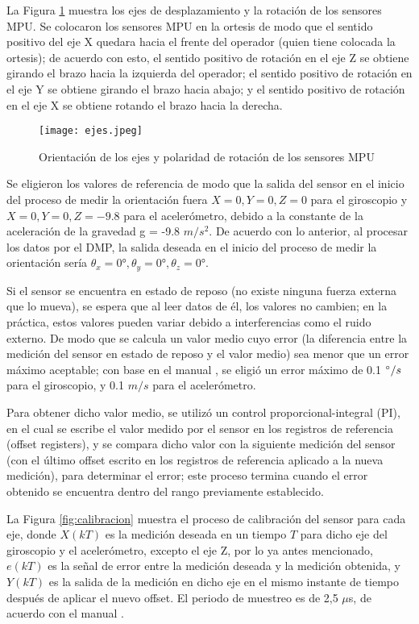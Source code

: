 \newpage
La Figura \ref{fig:ejes} muestra los ejes de desplazamiento y la rotación de los sensores MPU. Se colocaron los sensores MPU en la ortesis de modo que el sentido positivo del eje X quedara hacia el frente del operador (quien tiene colocada la ortesis); de acuerdo con esto, el sentido positivo de rotación en el eje Z se obtiene girando el brazo hacia la izquierda del operador; el sentido positivo de rotación en el eje Y se obtiene girando el brazo hacia abajo; y el sentido positivo de rotación en el eje X se obtiene rotando el brazo hacia la derecha.

\begin{figure}[htb]
	\centering
	\texttt{[image: ejes.jpeg]}
	\caption{Orientación de los ejes y polaridad de rotación de los sensores MPU}
	\label{fig:ejes}
\end{figure}

Se eligieron los valores de referencia de modo que la salida del sensor en el inicio del proceso de medir la orientación fuera $X=0, Y=0, Z=0$ para el giroscopio y $X=0, Y=0, Z=-9.8$ para el acelerómetro, debido a la constante de la aceleración de la gravedad g = -9.8  $m/s^2$. De acuerdo con lo anterior, al procesar los datos por el DMP, la salida deseada en el inicio del proceso de medir la orientación sería $\theta_x = 0°,\theta_y = 0°,\theta_z = 0°$.

Si el sensor se encuentra en estado de reposo (no existe ninguna fuerza externa que lo mueva), se espera que al leer datos de él, los valores no cambien; en la práctica, estos valores pueden variar debido a interferencias como el ruido externo. De modo que se calcula un valor medio cuyo error (la diferencia entre la medición del sensor en estado de reposo y el valor medio) sea menor que un error máximo aceptable; con base en el manual \cite{offsetMPU}, se eligió un error máximo de 0.1 $\degree/s$ para el giroscopio, y 0.1 $m/s$ para el acelerómetro.

Para obtener dicho valor medio, se utilizó un control proporcional-integral (PI), en el cual se escribe el valor medido por el sensor en los registros de referencia (offset registers), y se compara dicho valor con la siguiente medición del sensor (con el último offset escrito en los registros de referencia aplicado a la nueva medición), para determinar el error; este proceso termina cuando el error obtenido se encuentra dentro del rango previamente establecido.

La Figura \ref{fig:calibracion} muestra el proceso de calibración del sensor para cada eje, donde $X(kT)$  es la medición deseada en un tiempo $T$ para dicho eje del giroscopio y el acelerómetro, excepto el eje Z, por lo ya antes mencionado, $e(kT)$ es la señal de error entre la medición deseada y la medición obtenida, y $Y(kT)$ es la salida de la medición en dicho eje en el mismo instante de tiempo después de aplicar el nuevo offset. El periodo de muestreo es de 2,5 $\mu$s, de acuerdo con el manual \cite{offsetMPU}.

